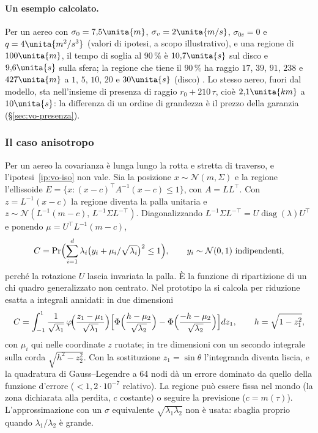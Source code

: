 \paragraph{Un esempio calcolato.} Per un aereo con $\sigma_0=7{,}5\unita{m}$, $\sigma_v=2\unita{m/s}$, $\sigma_{0v}=0$ e $q=4\unita{m^2/s^3}$ (valori di ipotesi, a scopo illustrativo), e una regione di $100\unita{m}$, il tempo di soglia al $90\,\%$ è $10{,}7\unita{s}$ sul disco e $9{,}6\unita{s}$ sulla sfera; la regione che tiene il $90\,\%$ ha raggio $17$, $39$, $91$, $238$ e $427\unita{m}$ a $1$, $5$, $10$, $20$ e $30\unita{s}$ (disco) . Lo stesso aereo, fuori dal modello, sta nell'insieme di presenza di raggio $r_0+210\,\tau$, cioè $2{,}1\unita{km}$ a $10\unita{s}$: la differenza di un ordine di grandezza è il prezzo della garanzia (\S\ref{sec:vo-presenza}).

\subsubsection{Il caso anisotropo}\label{sec:vo-c-aniso}

Per un aereo la covarianza è lunga lungo la rotta e stretta di traverso, e l'ipotesi~\ref{ip:vo-iso} non vale. Sia la posizione $x\sim\mathcal N(m,\Sigma)$ e la regione l'ellissoide $E=\{x:(x-c)^\top A^{-1}(x-c)\le1\}$, con $A=LL^\top$. Con $z=L^{-1}(x-c)$ la regione diventa la palla unitaria e $z\sim\mathcal N(L^{-1}(m-c),\,L^{-1}\Sigma L^{-\top})$. Diagonalizzando $L^{-1}\Sigma L^{-\top}=U\operatorname{diag}(\lambda)U^\top$ e ponendo $\mu=U^\top L^{-1}(m-c)$,
\begin{equation}\label{eq:vo-aniso}
C=\Pr\Bigl(\sum_{i=1}^d\lambda_i\bigl(y_i+\mu_i/\sqrt{\lambda_i}\bigr)^2\le1\Bigr),\qquad y_i\sim\mathcal N(0,1)\ \text{indipendenti},
\end{equation}
perché la rotazione $U$ lascia invariata la palla. È la funzione di ripartizione di un chi quadro generalizzato non centrato. Nel prototipo la si calcola per riduzione esatta a integrali annidati: in due dimensioni
\[C=\int_{-1}^{1}\frac{1}{\sqrt{\lambda_1}}\,\varphi\!\Bigl(\frac{z_1-\mu_1}{\sqrt{\lambda_1}}\Bigr)\Bigl[\Phi\Bigl(\frac{h-\mu_2}{\sqrt{\lambda_2}}\Bigr)-\Phi\Bigl(\frac{-h-\mu_2}{\sqrt{\lambda_2}}\Bigr)\Bigr]dz_1,\qquad h=\sqrt{1-z_1^2},\]
con $\mu_i$ qui nelle coordinate $z$ ruotate; in tre dimensioni con un secondo integrale sulla corda $\sqrt{h^2-z_2^2}$. Con la sostituzione $z_1=\sin\theta$ l'integranda diventa liscia, e la quadratura di Gauss--Legendre a 64 nodi dà un errore dominato da quello della funzione d'errore ($<1{,}2\cdot10^{-7}$ relativo). La regione può essere fissa nel mondo (la zona dichiarata alla perdita, $c$ costante) o seguire la previsione ($c=m(\tau)$). L'approssimazione con un $\sigma$ equivalente $\sqrt{\lambda_1\lambda_2}$ non è usata: sbaglia proprio quando $\lambda_1/\lambda_2$ è grande.

